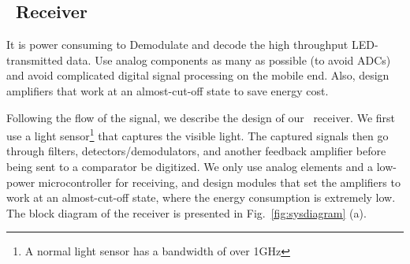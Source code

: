 




\subsection{\vitag\ Receiver}

\begin{tcolorbox}
\vskip 0.05in It is power consuming to Demodulate and decode the high throughput LED-transmitted data.
\vskip 0.05in Use analog components as many as possible (to avoid ADCs) and avoid complicated digital signal processing on the mobile end. Also, design amplifiers that work at an almost-cut-off state to save energy cost.
\end{tcolorbox}

Following the flow of the signal, we describe the design of our \vitag\ receiver. We first use a light sensor\footnote{A normal light sensor has a bandwidth of over 1GHz} that captures the visible light. The captured signals then go through filters, detectors/demodulators, and another feedback amplifier before being sent to a comparator be digitized. We only use analog elements and a low-power microcontroller for receiving, and design modules that set the amplifiers to work at an almost-cut-off state, where the energy consumption is extremely low. The block diagram of the receiver is presented in Fig.~\ref{fig:sysdiagram} (a).

